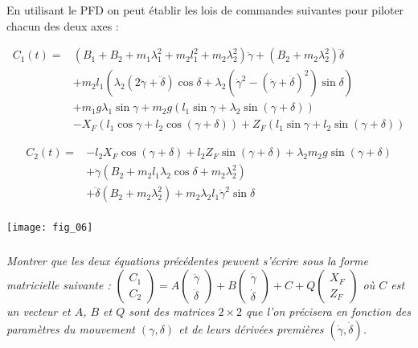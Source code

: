 \begin{multicols}{2}
En utilisant le PFD on peut établir les lois de commandes suivantes pour piloter chacun des deux axes : 

\footnotesize
$$
\begin{array}{ll}
C_1(t)=&
\left(B_1+B_2 +m_1 \lambda_1^2 + m_2 l_1^2 + m_2 \lambda_2^2 \right)\ddot{\gamma} +\left( B_2 + m_2\lambda_2^2\right) \ddot{\delta}\\
& +m_2 l_1 \left( \lambda_2 \left(2\ddot{\gamma}+\ddot{\delta} \right)\cos \delta + \lambda_2 \left( \dot{\gamma}^2-\left( \dot{\gamma} + \dot{\delta}\right)^2\right) \sin\delta\right) \\
& + m_1g\lambda_1\sin\gamma + m_2 g \left(l_1 \sin \gamma+\lambda_2 \sin \left(\gamma+ \delta\right) \right)\\
& -X_F \left( l_1 \cos \gamma +l_2 \cos \left( \gamma+\delta\right) \right) + Z_F \left( l_1 \sin \gamma + l_2 \sin \left( \gamma + \delta \right)\right)
\end{array}
$$


$$
\begin{array}{ll}
C_2(t) =&  - l_2X_F \cos \left(\gamma+\delta\right) 
             + l_2 Z_F \sin \left(\gamma+\delta\right) 
             + \lambda_2m_2g\sin \left(\gamma+\delta\right) \\
&  + \ddot{\gamma}\left(B_2+m_2l_1\lambda_2 \cos\delta + m_2\lambda_2^2\right) \\
& +\ddot{\delta}\left(B_2+ m_2 \lambda_2^2\right) +m_2\lambda_2 l_1 \dot{\gamma}^2 \sin \delta \\
\end{array}
$$

\normalsize

\begin{center}
\texttt{[image: fig\_06]}
\end{center}


\subparagraph{}\textit{Montrer que les deux équations précédentes peuvent s'écrire sous la forme matricielle suivante : 
$\begin{pmatrix}
C_1 \\ C_2
\end{pmatrix}
=
A
\begin{pmatrix}
\ddot{\gamma} \\ \ddot{\delta}
\end{pmatrix}
+
B
\begin{pmatrix}
\dot{\gamma} \\ \dot{\delta}
\end{pmatrix}
+
C
+
Q
\begin{pmatrix}
X_F \\ Z_F
\end{pmatrix}$ où $C$ est un vecteur et $A$, $B$ et $Q$ sont des matrices $2\times 2$ que l'on précisera en fonction des paramètres du mouvement $\left(\gamma,\delta\right)$ et de leurs dérivées premières $\left(\dot{\gamma},\dot{\delta}\right)$.
}


\end{multicols}
